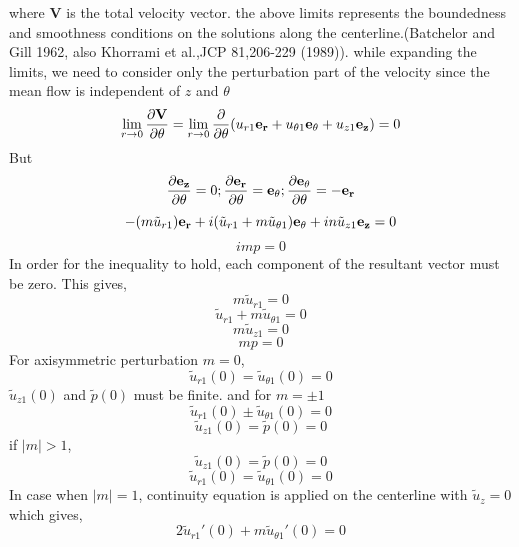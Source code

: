 \documentclass{article}
\begin{document}
where  {\bf V} is the total velocity vector. the above limits represents the boundedness and smoothness conditions on the solutions along the centerline.(Batchelor and Gill 1962, also Khorrami et al.,JCP 81,206-229 (1989)).  
while expanding the limits, we need to consider only the perturbation part of the velocity since the mean flow is independent of $z$ and $\theta$
\begin{equation*}
\lim _{r\rightarrow {0}}\frac{\partial \bf V}{\partial \theta} = \lim_{r\rightarrow{0}}\frac{\partial}{\partial \theta}(u_{r1}{\bf e_{r}} + u_{\theta 1}{\bf e_{\theta}} + u_{z1}{\bf e_{z}}) = 0
\end{equation*}
But 
\begin{equation}
\frac{\partial {\bf e_{z}}}{\partial \theta} = 0; \frac{\partial {\bf e_{r}}}{\partial \theta} ={\bf e_{\theta}}; \frac{\partial {\bf e_{\theta}}}{\partial \theta} = -{\bf e_{r}}
\end{equation}
\begin{equation*}
-(m\tilde{u}_{r1}){\bf e_{r}} + i(\tilde{u}_{r1}+m\tilde{u}_{\theta1}){\bf e_{\theta}} + in\tilde{u}_{z1}{\bf e_{z}}=0
\end{equation*}
\begin{equation*}
imp = 0
\end{equation*}
In order for the inequality to hold, each component of the resultant vector must be zero. This gives,
\begin{equation}
m\tilde{u}_{r1}=0
\end{equation}
\begin{equation}
\tilde{u}_{r1}+m\tilde{u}_{\theta1} = 0
\end{equation}
\begin{equation}
m\tilde{u}_{z1} =0
\end{equation}
\begin{equation}
mp = 0
\end{equation}
For axisymmetric perturbation $m = 0$,
\begin{equation}
\tilde{u}_{r1}(0) = \tilde{u}_{\theta1}(0) = 0 
\end{equation}
$ \tilde{u}_{z1}(0)$ and $\tilde{p}(0)$ must be finite.
and for $m =\pm 1$
\begin{equation}
\tilde{u}_{r1}(0) \pm  \tilde{u}_{\theta1}(0) = 0 
\end{equation}
\begin{equation}
 \tilde{u}_{z1}(0)=\tilde{p}(0)=0
\end{equation}
if $|m| > 1$,
\begin{equation}
 \tilde{u}_{z1}(0)=\tilde{p}(0)=0
\end{equation}
\begin{equation}
\tilde{u}_{r1}(0)= \tilde{u}_{\theta1}(0) = 0
\end{equation}
In case when $|m| =1$, continuity equation is applied on the centerline with $\tilde{u}_{z} = 0$ which gives,
\begin{equation}
2\tilde{u}_{r1}'(0) + m\tilde{u}_{\theta1}'(0) = 0
\end{equation}
\end{document}
